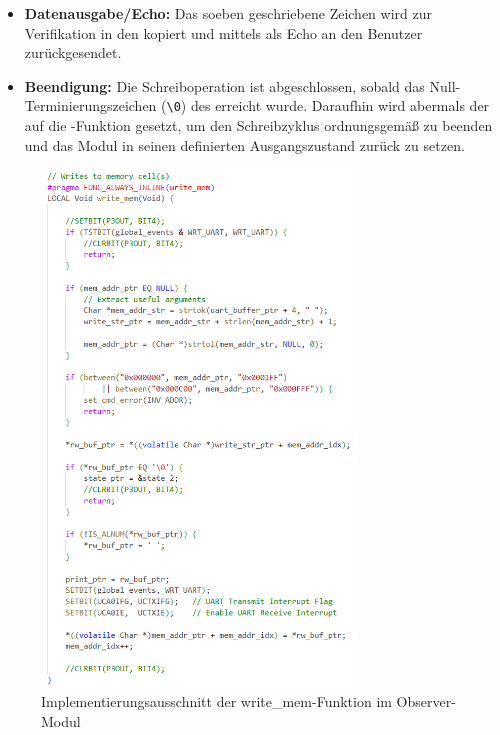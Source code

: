 \begin{itemize}
	\item \textbf{Datenausgabe/Echo:} Das soeben geschriebene Zeichen wird zur Verifikation in den  kopiert und mittels  als Echo an den Benutzer zur\"uckgesendet.
	
	\item \textbf{Beendigung:} Die Schreiboperation ist abgeschlossen, sobald das Null-Terminierungszeichen (\grq \texttt{\textbackslash 0}\grq) des  erreicht wurde. Daraufhin wird abermals der  auf die -Funktion gesetzt, um den Schreibzyklus ordnungsgem\"a{\ss} zu beenden und das Modul in seinen definierten Ausgangszustand zur\"uck zu setzen.
\end{itemize}

\newpage
\begin{figure}[h!]
	\centering
	\includegraphics[width=0.75\textwidth]{../Bilder/ObserverModule/write_mem.png}
	\caption{Implementierungsausschnitt der write\_mem-Funktion im Observer-Modul}
	\label{fig:write_mem_function}
\end{figure}

